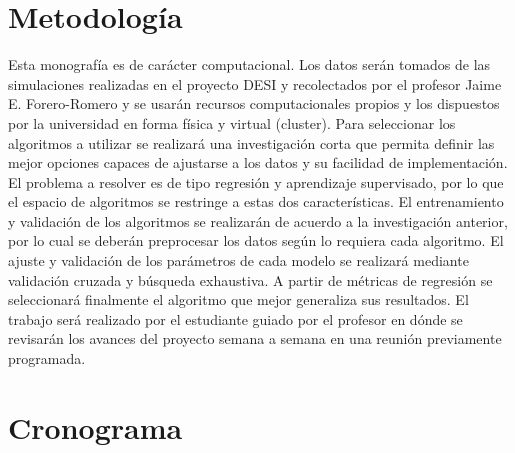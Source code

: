 \documentclass[12pt]{article}
\begin{document}
\section{Metodología}




Esta monografía es de carácter computacional. Los datos serán tomados de las simulaciones realizadas en el proyecto DESI y recolectados por el profesor Jaime E. Forero-Romero y se usarán recursos computacionales propios y los dispuestos por la universidad en forma física y virtual (cluster). Para seleccionar los algoritmos a utilizar se realizará una investigación corta que permita definir las mejor opciones capaces de ajustarse a los datos y su facilidad de implementación. El problema a resolver es de tipo regresión y aprendizaje supervisado, por lo que el espacio de algoritmos se restringe a estas dos características. El entrenamiento y validación de los algoritmos se realizarán de acuerdo a la investigación anterior, por lo cual se deberán preprocesar los datos según lo requiera cada algoritmo. El ajuste y validación de los parámetros de cada modelo se realizará mediante validación cruzada y búsqueda exhaustiva. A partir de métricas de regresión se seleccionará finalmente el algoritmo que mejor generaliza sus resultados. El trabajo será realizado por el estudiante guiado por el profesor en dónde se revisarán los avances del proyecto semana a semana en una reunión previamente programada. 
\section{Cronograma}
\end{document}
